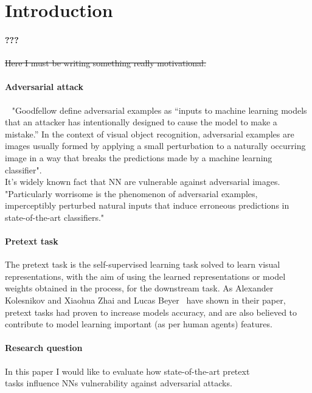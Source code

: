 \section{Introduction}


\paragraph{???} \st{Here I must be writing something really motivational.}
\\


\paragraph{Adversarial attack}
~\cite{DBLP:journals/corr/abs-1802-08195} "Goodfellow define adversarial examples as “inputs to machine learning models that an
attacker has intentionally designed to cause the model to make a mistake.” In the context of visual
object recognition, adversarial examples are images usually formed by applying a small perturbation
to a naturally occurring image in a way that breaks the predictions made by a machine learning
classifier".
\\
It’s widely known fact that NN are vulnerable against adversarial images.
\\\cite{ilyas2019adversarial} "Particularly worrisome is the phenomenon of adversarial examples, imperceptibly perturbed natural inputs that induce erroneous predictions in state-of-the-art classifiers."\newline

\paragraph{Pretext task}
The pretext task is the self-supervised learning task solved to learn visual representations,
with the aim of using the learned representations or model weights obtained in the process, for the downstream task.
As Alexander Kolesnikov and Xiaohua Zhai and Lucas Beyer~\cite{kolesnikov2019revisiting} have shown in their paper,
pretext tasks had proven to increase models accuracy, and are also believed to contribute to model learning important
(as per human agents) features.

\paragraph{Research question}
In this paper I would like to evaluate how state-of-the-art pretext \\
tasks influence NNs vulnerability against adversarial attacks.



